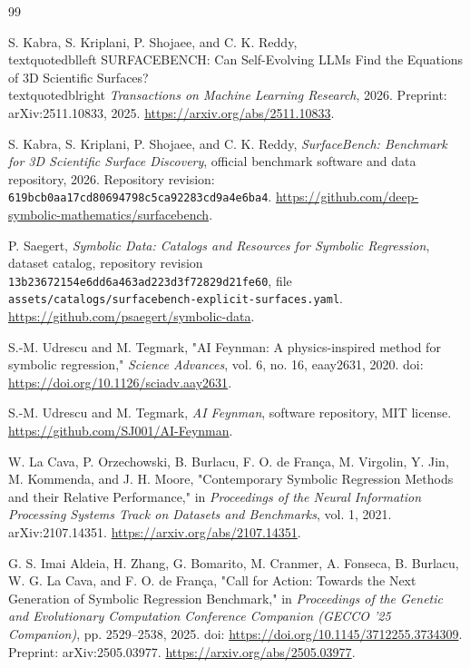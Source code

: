 \begin{thebibliography}{99}

S. Kabra, S. Kriplani, P. Shojaee, and C. K. Reddy,
\\textquotedblleft SURFACEBENCH: Can Self-Evolving LLMs Find the Equations of 3D Scientific Surfaces?\\textquotedblright
\emph{Transactions on Machine Learning Research}, 2026.
Preprint: arXiv:2511.10833, 2025.
\url{https://arxiv.org/abs/2511.10833}.

S. Kabra, S. Kriplani, P. Shojaee, and C. K. Reddy,
\emph{SurfaceBench: Benchmark for 3D Scientific Surface Discovery},
official benchmark software and data repository, 2026.
Repository revision: \texttt{619bcb0aa17cd80694798c5ca92283cd9a4e6ba4}.
\url{https://github.com/deep-symbolic-mathematics/surfacebench}.

P. Saegert,
\emph{Symbolic Data: Catalogs and Resources for Symbolic Regression},
dataset catalog, repository revision
\texttt{13b23672154e6dd6a463ad223d3f72829d21fe60},
file \texttt{assets/catalogs/surfacebench-explicit-surfaces.yaml}.
\url{https://github.com/psaegert/symbolic-data}.

S.-M. Udrescu and M. Tegmark,
"AI Feynman: A physics-inspired method for symbolic regression,"
\emph{Science Advances}, vol. 6, no. 16, eaay2631, 2020.
doi: \url{https://doi.org/10.1126/sciadv.aay2631}.

S.-M. Udrescu and M. Tegmark,
\emph{AI Feynman},
software repository, MIT license.
\url{https://github.com/SJ001/AI-Feynman}.

W. La Cava, P. Orzechowski, B. Burlacu, F. O. de França, M. Virgolin,
Y. Jin, M. Kommenda, and J. H. Moore,
"Contemporary Symbolic Regression Methods and their Relative Performance,"
in \emph{Proceedings of the Neural Information Processing Systems Track on
Datasets and Benchmarks}, vol. 1, 2021.
arXiv:2107.14351.
\url{https://arxiv.org/abs/2107.14351}.

G. S. Imai Aldeia, H. Zhang, G. Bomarito, M. Cranmer, A. Fonseca,
B. Burlacu, W. G. La Cava, and F. O. de França,
"Call for Action: Towards the Next Generation of Symbolic Regression Benchmark,"
in \emph{Proceedings of the Genetic and Evolutionary Computation Conference
Companion (GECCO '25 Companion)}, pp. 2529--2538, 2025.
doi: \url{https://doi.org/10.1145/3712255.3734309}.
Preprint: arXiv:2505.03977.
\url{https://arxiv.org/abs/2505.03977}.


\end{thebibliography}
